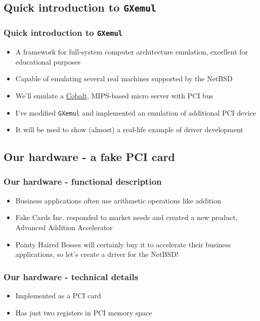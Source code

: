 \documentclass[dvipsnames,table]{beamer}
\begin{document}
\subsection{Quick introduction to {\tt GXemul}}

\begin{frame}
\frametitle{Quick introduction to {\tt GXemul}}
\begin{itemize}
	\item A framework for full-system computer architecture emulation, excellent for educational purposes
	\item Capable of emulating several real machines supported by the NetBSD
	\item We'll emulate a \href{http://en.wikipedia.org/wiki/Cobalt_Qube}{Cobalt}, MIPS-based micro server with PCI bus
	\item I've modified {\tt GXemul} and implemented an emulation of additional PCI device
	\item It will be used to show (almost) a real-life example of driver development
\end{itemize}
\end{frame}

\subsection{Our hardware - a fake PCI card}

\begin{frame}
\frametitle{Our hardware - functional description}
\begin{itemize}
	\item Business applications often use arithmetic operations like addition
	\item Fake Cards Inc. responded to market needs and created a new product, Advanced Addition Accelerator
	\item Pointy Haired Bosses will certainly buy it to accelerate their business applications, so let's create a driver for the NetBSD!
\end{itemize}
\end{frame}

\begin{frame}
\frametitle{Our hardware - technical details}
\begin{itemize}
	\item Implemented as a PCI card
	\item Has just two registers in PCI memory space
\end{itemize}
\end{frame}
\end{document}
